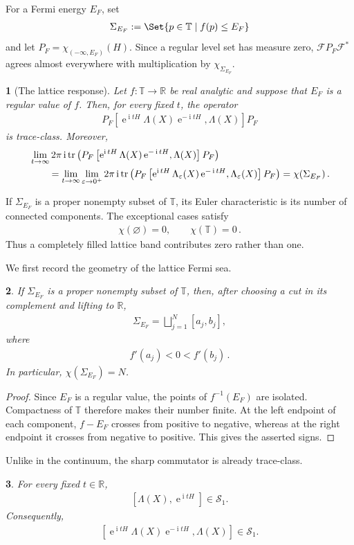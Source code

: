 \documentclass[a4paper,10pt]{article}
\numberwithin{equation}{section}
\theoremstyle{plain}
\newtheorem{thm}{\protect\theoremname}[section]
\theoremstyle{plain}
\newtheorem{lem}[thm]{\protect\lemmaname}
\theoremstyle{plain}
\theoremstyle{plain}
\theoremstyle{plain}
\theoremstyle{remark}
\theoremstyle{definition}
\theoremstyle{plain}
\providecommand{\lemmaname}{Lemma}
\providecommand{\theoremname}{Theorem}
\newcommand{\ee}{\operatorname{e}}
\newcommand{\ii}{\operatorname{i}}
\newcommand{\TT}{\mathbb{T}}
\newcommand{\RR}{\mathbb{R}}
\newcommand{\calF}{\mathcal{F}}
\newcommand{\tr}{\operatorname{tr}}
\newcommand{\ve}{\varepsilon}
\newcommand{\eq}[1]{\begin{align*}#1\end{align*}}
\newcommand{\eql}[1]{\begin{align}#1\end{align}}
\begin{document}
For a Fermi energy $E_F$, set
\eq{\Sigma_{E_F}:=\Set{p\in\TT\mid f(p)\leq E_F}}
and let $P_F=\chi_{(-\infty,E_F)}(H)$. Since a regular level set has measure
zero, $\calF P_F\calF^*$ agrees almost everywhere with multiplication by
$\chi_{\Sigma_{E_F}}$.

\begin{thm}[The lattice response]\label{thm:lattice response}
Let $f:\TT\to\RR$ be real analytic and suppose that $E_F$ is a regular value
of $f$. Then, for every fixed $t$, the operator
\eql{P_F\left[
\ee^{\ii tH}\Lambda(X)\ee^{-\ii tH},\Lambda(X)
\right]P_F}
is trace-class. Moreover,
\eql{&\lim_{t\to\infty}
2\pi\ii\tr\left(
P_F\left[
\ee^{\ii tH}\Lambda(X)\ee^{-\ii tH},\Lambda(X)
\right]P_F
\right)\notag\\
&\qquad=
\lim_{t\to\infty}\lim_{\ve\to0^+}
2\pi\ii\tr\left(
P_F\left[
\ee^{\ii tH}\Lambda_\ve(X)\ee^{-\ii tH},
\Lambda_\ve(X)
\right]P_F
\right)
=\chi(\Sigma_{E_F})\,.
\label{eq:lattice response}}
\end{thm}

If $\Sigma_{E_F}$ is a proper nonempty subset of $\TT$, its Euler
characteristic is its number of connected components. The exceptional cases
satisfy
\eq{\chi(\varnothing)=0,\qquad \chi(\TT)=0\,.}
Thus a completely filled lattice band contributes zero rather than one.

We first record the geometry of the lattice Fermi sea.

\begin{lem}\label{lem:lattice Fermi arcs}
If $\Sigma_{E_F}$ is a proper nonempty subset of $\TT$, then, after choosing
a cut in its complement and lifting to $\RR$,
\eq{\Sigma_{E_F}=\bigsqcup_{j=1}^{N}[a_j,b_j],}
where
\eq{f'(a_j)<0<f'(b_j)\,.}
In particular, $\chi(\Sigma_{E_F})=N$.
\end{lem}

\begin{proof}
Since $E_F$ is a regular value, the points of $f^{-1}(E_F)$ are isolated.
Compactness of $\TT$ therefore makes their number finite. At the left
endpoint of each component, $f-E_F$ crosses from positive to negative,
whereas at the right endpoint it crosses from negative to positive. This
gives the asserted signs.
\end{proof}

Unlike in the continuum, the sharp commutator is already trace-class.

\begin{lem}\label{lem:lattice trace class}
For every fixed $t\in\RR$,
\eq{\left[\Lambda(X),\ee^{\ii tH}\right]\in\mathcal{S}_1.}
Consequently,
\eq{\left[
\ee^{\ii tH}\Lambda(X)\ee^{-\ii tH},\Lambda(X)
\right]\in\mathcal{S}_1.}
\end{lem}
\end{document}
